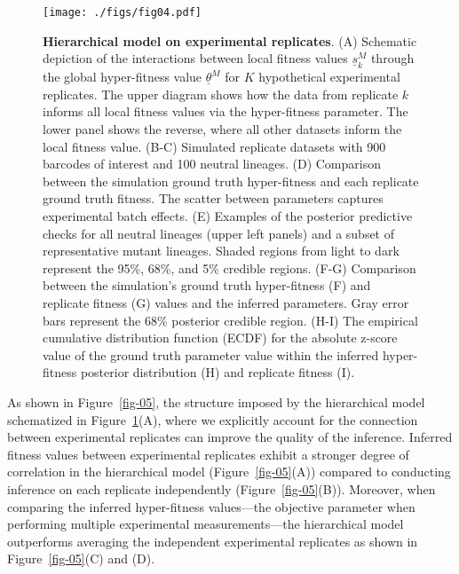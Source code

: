 \documentclass[
]{scrartcl}
\begin{document}
\begin{refsegment}
\begin{figure}

{\centering \texttt{[image: ./figs/fig04.pdf]}

}

\caption{\label{fig-04}\textbf{Hierarchical model on experimental
replicates}. (A) Schematic depiction of the interactions between local
fitness values \(\underline{s}_k^M\) through the global hyper-fitness
value \(\underline{\theta}^M\) for \(K\) hypothetical experimental
replicates. The upper diagram shows how the data from replicate \(k\)
informs all local fitness values via the hyper-fitness parameter. The
lower panel shows the reverse, where all other datasets inform the local
fitness value. (B-C) Simulated replicate datasets with 900 barcodes of
interest and 100 neutral lineages. (D) Comparison between the simulation
ground truth hyper-fitness and each replicate ground truth fitness. The
scatter between parameters captures experimental batch effects. (E)
Examples of the posterior predictive checks for all neutral lineages
(upper left panels) and a subset of representative mutant lineages.
Shaded regions from light to dark represent the 95\%, 68\%, and 5\%
credible regions. (F-G) Comparison between the simulation's ground truth
hyper-fitness (F) and replicate fitness (G) values and the inferred
parameters. Gray error bars represent the 68\% posterior credible
region. (H-I) The empirical cumulative distribution function (ECDF) for
the absolute z-score value of the ground truth parameter value within
the inferred hyper-fitness posterior distribution (H) and replicate
fitness (I).}

\end{figure}

As shown in Figure~\ref{fig-05}, the structure imposed by the
hierarchical model schematized in Figure~\ref{fig-04}(A), where we
explicitly account for the connection between experimental replicates
can improve the quality of the inference. Inferred fitness values
between experimental replicates exhibit a stronger degree of correlation
in the hierarchical model (Figure~\ref{fig-05}(A)) compared to
conducting inference on each replicate independently
(Figure~\ref{fig-05}(B)). Moreover, when comparing the inferred
hyper-fitness values---the objective parameter when performing multiple
experimental measurements---the hierarchical model outperforms averaging
the independent experimental replicates as shown in
Figure~\ref{fig-05}(C) and (D).

\begin{figure}


\end{figure}
\end{refsegment}
\end{document}
